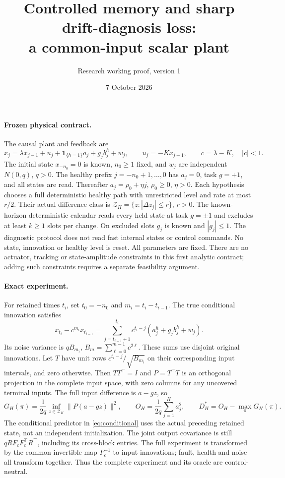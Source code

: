 \documentclass[11pt]{article}
\title{Controlled memory and sharp drift-diagnosis loss:\\a common-input scalar plant}
\author{Research working proof, version 1}
\date{7 October 2026}
\begin{document}
\maketitle
\paragraph{Frozen physical contract.}
The causal plant and feedback are
\[
x_j=\lambda x_{j-1}+u_j+\mathbf1_{\{h=1\}}a_j+g_jb_j^h+w_j,\qquad
u_j=-Kx_{j-1},\qquad c=\lambda-K,\quad |c|<1.
\]
The initial state $x_{-n_0}=0$ is known, $n_0\ge1$ fixed, and
$w_j$ are independent $N(0,q)$, $q>0$. The healthy prefix
$j=-n_0+1,\ldots,0$ has $a_j=0$, task $g=+1$, and all states are read.
Thereafter $a_j=\rho_0+\eta j$, $\rho_0\ge0$, $\eta>0$.
Each hypothesis chooses a full deterministic healthy path with unrestricted
level and rate at most $r/2$. Their actual difference class is
$\mathcal Z_H=\{z:|\Delta z_j|\le r\}$, $r>0$.
The known-horizon deterministic calendar reads every held state at task
$g=\pm1$ and excludes at least $k\ge1$ slots per change.
On excluded slots $g_j$ is known and $|g_j|\le1$.
The diagnostic protocol does not read fast internal states or control
commands. No state, innovation or healthy level is reset.
All parameters are fixed. There are no actuator, tracking or state-amplitude
constraints in this first analytic contract; adding such constraints requires
a separate feasibility argument.

\paragraph{Exact experiment.}
For retained times $t_i$, set $t_0=-n_0$ and $m_i=t_i-t_{i-1}$.
The true conditional innovation satisfies
\begin{equation}\label{eq:conditional}
x_{t_i}-c^{m_i}x_{t_{i-1}}
=\sum_{j=t_{i-1}+1}^{t_i}c^{t_i-j}(a_j^h+g_jb_j^h+w_j).
\end{equation}
Its noise variance is $qB_{m_i}$,
$B_m=\sum_{\ell=0}^{m-1}c^{2\ell}$.
These sums use disjoint original innovations. Let $T$ have unit rows
$c^{t_i-j}/\sqrt{B_{m_i}}$ on their corresponding input intervals,
and zero otherwise. Then $TT^\top=I$ and $P=T^\top T$ is an orthogonal
projection in the complete input space, with zero columns for any uncovered
terminal inputs. The full input difference is $a-gz$, so
\[
G_H(\pi)=\frac1{2q}\inf_{z\in\mathcal Z_H}\|P(a-gz)\|^2,\qquad
O_H=\frac1{2q}\sum_{j=1}^H a_j^2,\qquad D_H^*=O_H-\max_\pi G_H(\pi).
\]
The conditional predictor in \eqref{eq:conditional} uses the actual preceding
retained state, not an independent initialization. The joint output
covariance is still $qRF_cF_c^\top R^\top$, including its cross-block entries.
The full experiment is transformed by the common invertible map $F_c^{-1}$
to input innovations; fault, health and noise all transform together.
Thus the complete experiment and its oracle are control-neutral.
\end{document}
